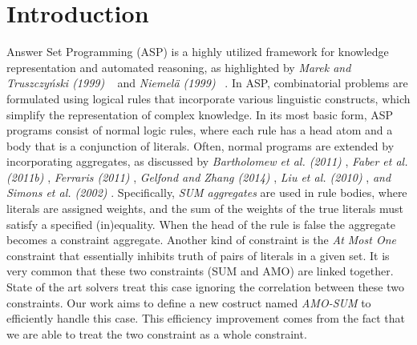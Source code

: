 \chapter*{Introduction}
Answer Set Programming (ASP) is a highly utilized framework for knowledge 
representation and automated reasoning, as highlighted by \textit{Marek and Truszczyński (1999)} ~\cite{MarekT99}
and \textit{Niemelä (1999)} ~\cite{Niemela99}. 
In ASP, combinatorial problems are formulated using logical rules that incorporate various
linguistic constructs, which simplify the representation of complex knowledge.
In its most basic form, ASP programs consist of normal logic rules, where each rule 
has a head atom and a body that is a conjunction of literals. 
Often, normal programs are extended by incorporating aggregates, as discussed by 
\textit{Bartholomew et al. (2011)} \cite{DBLP:conf/aaaiss/BartholomewLM11}, \textit{Faber et al. (2011b)}
\cite{DBLP:journals/ai/FaberPL11}, \textit{Ferraris (2011)} \cite{DBLP:journals/tocl/Ferraris11},
\textit{Gelfond and Zhang (2014)} \cite{DBLP:journals/tplp/GelfondZ14},
\textit{Liu et al. (2010)} \cite{DBLP:journals/ai/LiuPST10},\textit{ and Simons et al. (2002)}
\cite{DBLP:journals/ai/LiuPST10}.
Specifically, \textit{SUM aggregates} are used in rule 
bodies, where literals are assigned weights, 
and the sum of the weights of the true literals must satisfy a specified (in)equality.
When the head of the rule is false the aggregate becomes a constraint aggregate.
Another kind of constraint is the \textit{At Most One} constraint
that essentially inhibits truth of pairs of literals in a given set.
It is very common that these two constraints (SUM and AMO) are linked together.
State of the art solvers treat this case ignoring the correlation between these two constraints. 
Our work aims to define a new costruct named \textit{AMO-SUM} to efficiently handle this case.
This efficiency improvement comes from the fact that we are able to treat the two constraint
as a whole constraint.


